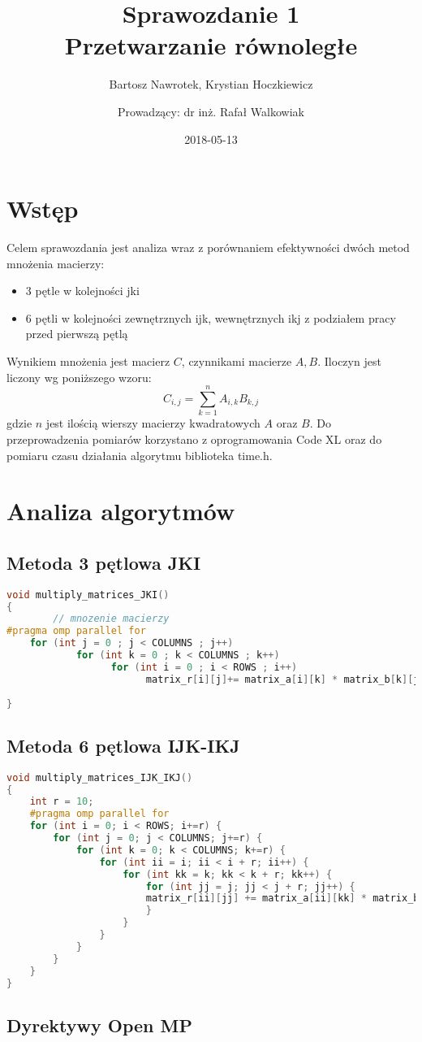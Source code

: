 \documentclass{scrartcl}
\title{Sprawozdanie 1 \\ Przetwarzanie równoległe}
\subtitle{Mnożenie macierzy porównanie efektywności metod –\and
3 pętle - kolejność pętli: jki,\and
6 pętli - kolejność pętli: zewnętrznych ijk, wewnętrznych: ikj, podział pracy przed pętlą 1.}
\date{2018-05-13}
\author{{Bartosz Nawrotek, Krystian Hoczkiewicz}\and {Prowadzący: dr inż. Rafał Walkowiak}
}
\begin{document}
\maketitle
\section{Wstęp}
Celem sprawozdania jest analiza wraz z porównaniem efektywności dwóch metod mnożenia macierzy:
\begin{itemize}
\item {3 pętle w kolejności jki}
\item {6 pętli w kolejności zewnętrznych ijk, wewnętrznych ikj z podziałem pracy przed pierwszą pętlą}
\end{itemize}
Wynikiem mnożenia jest macierz $C$, czynnikami macierze $A, B$. Iloczyn jest liczony wg poniższego wzoru:
\begin{equation}
C_{i, j} = \sum_{k = 1}^{n}{A_{i, k}B_{k, j}}
\end{equation}
gdzie $n$ jest ilością wierszy macierzy kwadratowych $A$ oraz $B$.
Do przeprowadzenia pomiarów korzystano z oprogramowania Code XL oraz do pomiaru czasu działania algorytmu biblioteka time.h.
\section{Analiza algorytmów}
\subsection{Metoda 3 pętlowa JKI}
\begin{lstlisting}[language=C++]
void multiply_matrices_JKI()
{
        // mnozenie macierzy 
#pragma omp parallel for 
	for (int j = 0 ; j < COLUMNS ; j++)
      	    for (int k = 0 ; k < COLUMNS ; k++) 
                  for (int i = 0 ; i < ROWS ; i++) 
                        matrix_r[i][j]+= matrix_a[i][k] * matrix_b[k][j] ;
                   
}
\end{lstlisting}
\subsection{Metoda 6 pętlowa IJK-IKJ}
\begin{lstlisting}[language=C++]
void multiply_matrices_IJK_IKJ()
{
	int r = 10;
	#pragma omp parallel for
	for (int i = 0; i < ROWS; i+=r) {
		for (int j = 0; j < COLUMNS; j+=r) {
			for (int k = 0; k < COLUMNS; k+=r) {
				for (int ii = i; ii < i + r; ii++) {
					for (int kk = k; kk < k + r; kk++) {
						for (int jj = j; jj < j + r; jj++) {
						matrix_r[ii][jj] += matrix_a[ii][kk] * matrix_b[kk][jj];
						}
					}
				}
			}
		}
	}
}
\end{lstlisting}
\subsection{Dyrektywy Open MP}
\section{}
\end{document}
